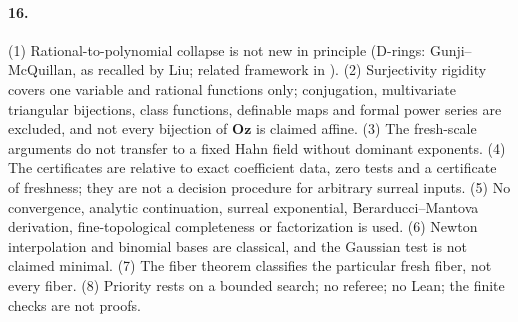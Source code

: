 \documentclass[11pt,letterpaper]{article}
\numberwithin{equation}{section}
\theoremstyle{definition}
\theoremstyle{remark}
\theoremstyle{plain}
\newcommand{\Oz}{\mathbf{Oz}}
\begin{document}
\paragraph{16.} (1) Rational-to-polynomial collapse is not new in principle (D-rings: Gunji--McQuillan, as recalled by
Liu; related framework in \cite{CFMT}). (2) Surjectivity rigidity covers one variable and rational functions only;
conjugation, multivariate triangular bijections, class functions, definable maps and formal power series are excluded,
and not every bijection of $\Oz$ is claimed affine. (3) The fresh-scale arguments do not transfer to a fixed Hahn field
without dominant exponents. (4) The certificates are relative to exact coefficient data, zero tests and a certificate of
freshness; they are not a decision procedure for arbitrary surreal inputs. (5) No convergence, analytic continuation,
surreal exponential, Berarducci--Mantova derivation, fine-topological completeness or factorization is used. (6) Newton
interpolation and binomial bases are classical, and the Gaussian test is not claimed minimal. (7) The fiber theorem
classifies the particular fresh fiber, not every fiber. (8) Priority rests on a bounded search; no referee; no Lean; the
finite checks are not proofs.
\end{document}
